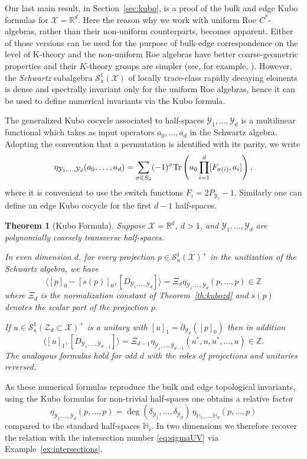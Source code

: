\documentclass[12pt]{amsart}
\newtheorem{theorem}{Theorem}[section]
\newcommand{\RM}{{\mathbb R}}
\newcommand{\ZM}{{\mathbb Z}}
\newcommand{\Ss}{{\mathcal S}}
\newcommand{\Xx}{{\mathcal X}}
\newcommand{\Yy}{{\mathcal Y}}
\newcommand{\Zz}{{\mathcal Z}}
\newcommand{\Tr}{\mbox{\rm Tr}}
\newcommand{\pdv}{\partial}
\begin{document}
Our last main result, in Section~\ref{sec:kubo}, is a proof of the bulk and edge Kubo formulas for $\Xx = \RM^d$. Here the reason why we work with uniform Roe $C^*$-algebras, rather than their non-uniform counterparts, becomes apparent. Either of those versions can be used for the purpose of bulk-edge correspondence on the level of K-theory and the non-uniform Roe algebras have better coarse-geometric properties and their $K$-theory groups are simpler (see, for example, \cite{Roe2003,Roe1996}). However, the \textit{Schwartz} subalgebra $\Ss^1_u(\Xx)$ of locally trace-class rapidly decaying elements is dense and spectrally invariant only for the uniform Roe algebras, hence it can be used to define numerical invariants via the Kubo formula. 

The generalized Kubo cocycle associated to half-spaces $\Yy_1,\ldots,\Yy_d$ is a multilinear functional which takes as input operators $a_0,\ldots,a_d$ in the Schwartz algebra.
Adopting the convention that a permutation is identified with its parity, we write
\[\eta_{\Yy_1,\ldots,\Yy_d}(a_0, \dots, a_{d}) = \sum_{\sigma \in S_d} (-1)^{\sigma} \Tr\left(a_0 \prod_{i=1}^d [F_{\sigma(i)}, a_i]\right),\]
where it is convenient to use the switch functions $F_{i} = 2 P_{\Yy_i}-1$. Similarly one can define an edge Kubo cocycle for the first $d-1$ half-spaces.

\begin{theorem}[Kubo Formula]\label{thm:kubo_intro}
Suppose $\Xx = \RM^d$, $d>1$, and $\Yy_1,\dots, \Yy_d$ are polynomially coarsely transverse half-spaces.

In even dimension $d$, for every projection $p\in \Ss^1_u(\Xx)^+$  in the unitization of the Schwartz algebra, we have
\begin{equation}
\label{eq:kubo_bulk_index_intro}
 \langle [p]_0-[s(p)]_0,  [D_{\Yy_1,\ldots,\Yy_d}]\rangle= \Xi_d \eta_{\Yy_1,\ldots,\Yy_d}(p,\ldots,p) \in \ZM
\end{equation}
where $\Xi_d$ is the normalization constant of Theorem~\ref{th:kubozd} and $s(p)$ denotes the scalar part of the projection $p$. 

If $u\in \Ss^1_u(\Zz_d\subset \Xx)^+$ is a unitary with $[u]_1=\pdv_{\Yy_d} ([p]_0)$ then in addition
$$\langle [u]_1, [D_{\Yy_1,\ldots,\Yy_{d-1}}]\rangle=\Xi_{d-1} \eta_{\Yy_1,\ldots,\Yy_{d-1}}(u^*,u,u^*,\dots,u)\in \ZM.$$
The analogous formulas hold for odd $d$ with the roles of projections and unitaries reversed.
\end{theorem}
As these numerical formulas reproduce the bulk and edge topological invariants, using the Kubo formulas for non-trivial half-spaces one obtains a relative factor 
$$\eta_{\Yy_1,\ldots,\Yy_d}(p,\ldots,p)=\deg(\delta_{\Yy_1},\ldots,\delta_{\Yy_d}) \,\eta_{\mathbb{H}_1,\ldots,\mathbb{H}_d}(p,\ldots,p)$$
compared to the standard half-spaces $\mathbb{H}_i$. In two dimensions we therefore recover the relation with the intersection number \eqref{eq:sigmaUV} via Example~\ref{ex:intersections}.
\end{document}
